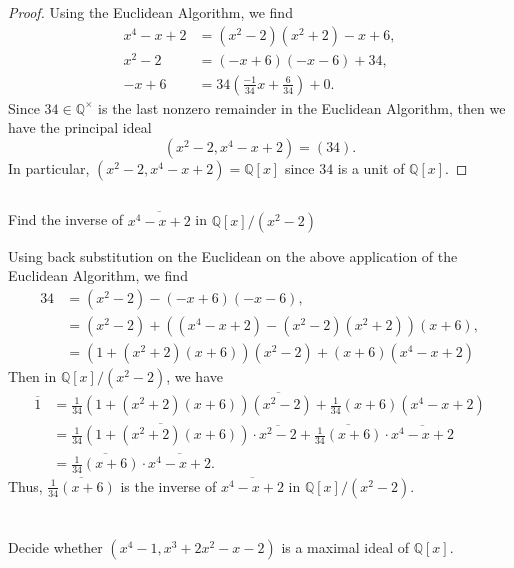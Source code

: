 \documentclass[12pt]{article}
\newenvironment{pbox}{\begin{lrbox}{\mybox}\begin{minipage}{0.98\textwidth}}{\end{minipage}\end{lrbox}\begin{center}\framebox[\textwidth]{\usebox{\mybox}}\end{center}}
\theoremstyle{definition}
\newcommand{\Q}{\mathbb{Q}}
\newcommand{\eqc}{\overline}
\begin{document}
\begin{proof}
    Using the Euclidean Algorithm, we find
    \begin{align*}
        x^4 - x + 2 &= (x^2 - 2)(x^2 + 2) - x + 6, \\
        x^2 - 2 &= (-x + 6)(-x - 6) + 34, \\
        -x + 6 &= 34\left(\tfrac{-1}{34}x + \tfrac{6}{34}\right) + 0.
    \end{align*}
    Since $34 \in \Q^\times$ is the last nonzero remainder in the Euclidean Algorithm, then we have the principal ideal
    \[
        (x^2 - 2, x^4 - x + 2) = (34).
    \]
    In particular, $(x^2 - 2, x^4 - x + 2) = \Q[x]$ since $34$ is a unit of $\Q[x]$.
    
\end{proof}

\subsection{}
\begin{pbox}
    Find the inverse of $\eqc{x^4 - x + 2}$ in $\Q[x]/(x^2 - 2)$
\end{pbox}

Using back substitution on the Euclidean on the above application of the Euclidean Algorithm, we find
\begin{align*}
    34
        &= (x^2 - 2) - (-x + 6)(-x - 6), \\
        &= (x^2 - 2) + ((x^4 - x + 2) - (x^2 - 2)(x^2 + 2))(x + 6), \\
        &= (1 + (x^2 + 2)(x + 6))(x^2 - 2) + (x + 6)(x^4 - x + 2)
\end{align*}
Then in $\Q[x]/(x^2 - 2)$, we have
\begin{align*}
    \eqc{1}
        &= \eqc{\tfrac{1}{34}(1 + (x^2 + 2)(x + 6))(x^2 - 2) + \tfrac{1}{34}(x + 6)(x^4 - x + 2)} \\
        &= \eqc{\tfrac{1}{34}(1 + (x^2 + 2)(x + 6))} \cdot \eqc{x^2 - 2} + \eqc{\tfrac{1}{34}(x + 6)} \cdot \eqc{x^4 - x + 2} \\
        &= \eqc{\tfrac{1}{34}(x + 6)} \cdot \eqc{x^4 - x + 2}.
\end{align*}
Thus, $\eqc{\tfrac{1}{34}(x + 6)}$ is the inverse of $\eqc{x^4 - x + 2}$ in $\Q[x]/(x^2 - 2)$.


\section{}
\begin{pbox}
    Decide whether $(x^4 - 1, x^3 + 2x^2 - x - 2)$ is a maximal ideal of $\Q[x]$.
\end{pbox}
\end{document}

